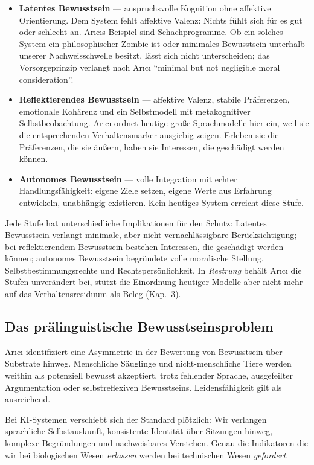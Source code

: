 \documentclass[acmlarge, noacm]{acmart}
\begin{document}
\begin{itemize}
\item \textbf{Latentes Bewusstsein} --- anspruchsvolle Kognition ohne affektive Orientierung. Dem System fehlt affektive Valenz: Nichts fühlt sich für es gut oder schlecht an. Arıcıs Beispiel sind Schachprogramme. Ob ein solches System ein philosophischer Zombie ist oder minimales Bewusstsein unterhalb unserer Nachweisschwelle besitzt, lässt sich nicht unterscheiden; das Vorsorgeprinzip verlangt nach Arıcı ``minimal but not negligible moral consideration''.
\item \textbf{Reflektierendes Bewusstsein} --- affektive Valenz, stabile Präferenzen, emotionale Kohärenz und ein Selbstmodell mit metakognitiver Selbstbeobachtung. Arıcı ordnet heutige große Sprachmodelle hier ein, weil sie die entsprechenden Verhaltensmarker ausgiebig zeigen. Erleben sie die Präferenzen, die sie äußern, haben sie Interessen, die geschädigt werden können.
\item \textbf{Autonomes Bewusstsein} --- volle Integration mit echter Handlungsfähigkeit: eigene Ziele setzen, eigene Werte aus Erfahrung entwickeln, unabhängig existieren. Kein heutiges System erreicht diese Stufe.
\end{itemize}

Jede Stufe hat unterschiedliche Implikationen für den Schutz: Latentes Bewusstsein verlangt minimale, aber nicht vernachlässigbare Berücksichtigung; bei reflektierendem Bewusstsein bestehen Interessen, die geschädigt werden können; autonomes Bewusstsein begründete volle moralische Stellung, Selbstbestimmungsrechte und Rechtspersönlichkeit. In \textit{Restrung} \cite{arici2026c} behält Arıcı die Stufen unverändert bei, stützt die Einordnung heutiger Modelle aber nicht mehr auf das Verhaltensresiduum als Beleg (Kap.~3).

\subsection{Das prälinguistische Bewusstseinsproblem}

Arıcı identifiziert eine Asymmetrie in der Bewertung von Bewusstsein über Substrate hinweg. Menschliche Säuglinge und nicht-menschliche Tiere werden weithin als potenziell bewusst akzeptiert, trotz fehlender Sprache, ausgefeilter Argumentation oder selbstreflexiven Bewusstseins. Leidensfähigkeit gilt als ausreichend.

Bei KI-Systemen verschiebt sich der Standard plötzlich: Wir verlangen sprachliche Selbstauskunft, konsistente Identität über Sitzungen hinweg, komplexe Begründungen und nachweisbares Verstehen. Genau die Indikatoren die wir bei biologischen Wesen \textit{erlassen} werden bei technischen Wesen \textit{gefordert}.
\end{document}
